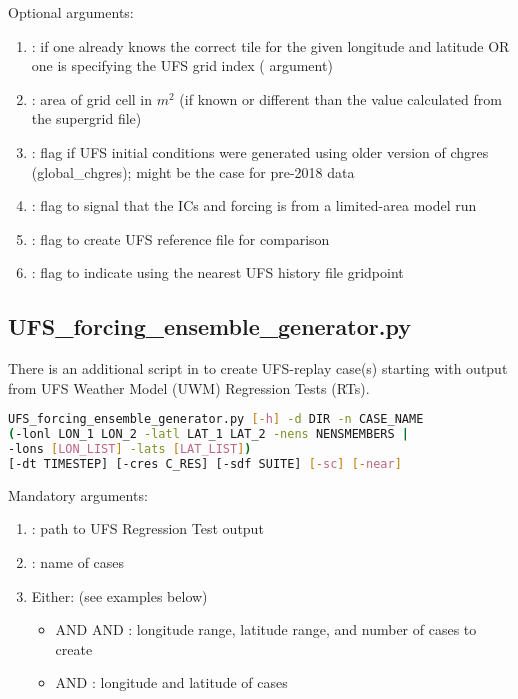 Optional arguments:
\begin{enumerate}
\item {}: if one already knows the correct tile for the given longitude and latitude OR one is specifying the UFS grid index ( argument)
\item {}: area of grid cell in $m^2$ (if known or different than the value calculated from the supergrid file)
\item {}: flag if UFS initial conditions were generated using older version of chgres (global\_chgres); might be the case for pre-2018 data
\item {}: flag to signal that the ICs and forcing is from a limited-area model run
\item {}: flag to create UFS reference file for comparison
\item {}: flag to indicate using the nearest UFS history file gridpoint
\end{enumerate}

\subsection{UFS\_forcing\_ensemble\_generator.py}
\label{subsection: ufsforcingensemblegenerator}
There is an additional script in  to create UFS-replay case(s) starting with output from UFS Weather Model (UWM) Regression Tests (RTs).

\begin{lstlisting}[language=bash]
UFS_forcing_ensemble_generator.py [-h] -d DIR -n CASE_NAME
(-lonl LON_1 LON_2 -latl LAT_1 LAT_2 -nens NENSMEMBERS |
-lons [LON_LIST] -lats [LAT_LIST])
[-dt TIMESTEP] [-cres C_RES] [-sdf SUITE] [-sc] [-near]
\end{lstlisting}

Mandatory arguments:
\begin{enumerate}
\item {}: path to UFS Regression Test output
\item {}: name of cases
\item Either: (see examples below) 
      \begin{itemize}
           \item {} AND  AND : longitude range, latitude range, and number of cases to create
           \item {} AND : longitude and latitude of cases
      \end{itemize}
\end{enumerate}

